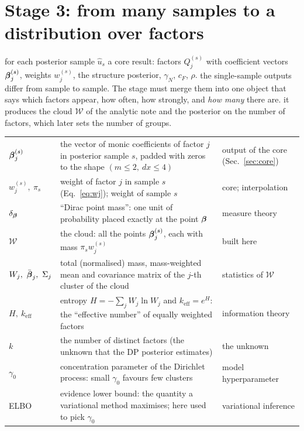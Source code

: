 \section{Stage 3: from many samples to a distribution over factors}\label{sec:agg}
\sectionbrief
{for each posterior sample $\hat u_s$ a core result: factors $Q^{(s)}_j$ with coefficient vectors $\boldsymbol\beta^{(s)}_j$, weights $w^{(s)}_j$, the structure posterior, $\gamma_N$, $c_F$, $\rho$.}
{the single-sample outputs differ from sample to sample. The stage must merge them into one object that says which factors appear, how often, how strongly, and \emph{how many} there are.}
{it produces the cloud $\mathcal W$ of the analytic note and the posterior on the number of factors, which later sets the number of groups.}

\begin{symbols}
\begin{tabular}{@{}L{2.6cm}L{6.0cm}L{4.3cm}@{}}
$\boldsymbol\beta^{(s)}_j$ & the vector of monic coefficients of factor $j$ in posterior sample $s$, padded with zeros to the shape $(m\le2,\ dx\le4)$ & output of the core (Sec.~\ref{sec:core})\\
$w^{(s)}_j,\ \pi_s$ & weight of factor $j$ in sample $s$ (Eq.~\eqref{eq:wj}); weight of sample $s$ & core; interpolation\\
$\delta_{\boldsymbol\beta}$ & ``Dirac point mass'': one unit of probability placed exactly at the point $\boldsymbol\beta$ & measure theory\\
$\mathcal W$ & the cloud: all the points $\boldsymbol\beta^{(s)}_j$, each with mass $\pi_sw^{(s)}_j$ & built here\\
$W_j,\ \bar{\boldsymbol\beta}_j,\ \Sigma_j$ & total (normalised) mass, mass-weighted mean and covariance matrix of the $j$-th cluster of the cloud & statistics of $\mathcal W$\\
$H,\ k_{\mathrm{eff}}$ & entropy $H=-\sum_jW_j\ln W_j$ and $k_{\mathrm{eff}}=e^{H}$: the ``effective number'' of equally weighted factors & information theory\\
$k$ & the number of distinct factors (the unknown that the DP posterior estimates) & the unknown\\
$\gamma_0$ & concentration parameter of the Dirichlet process: small $\gamma_0$ favours few clusters & model hyperparameter\\
ELBO & evidence lower bound: the quantity a variational method maximises; here used to pick $\gamma_0$ & variational inference\\
\end{tabular}
\end{symbols}

